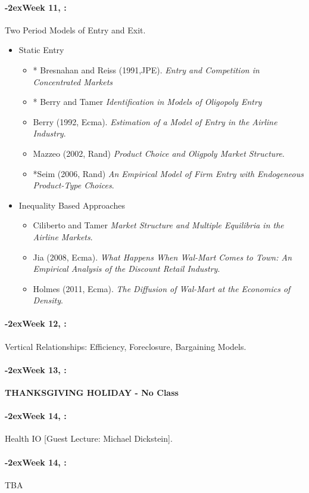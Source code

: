 \documentclass[11pt]{article}
\newcommand{\week}[1]{%
  \paragraph*{\kern-2ex\quad #1, \syldate{\today}:}%
  \ifdim\wd1=\wd\THURSDAY
    \AdvanceDate[7]
  \else
    \AdvanceDate[7]
  \fi%
}
\begin{document}
\week{Week 11} Two Period Models of Entry and Exit.
\begin{itemize}
\item Static Entry
\begin{itemize}
\item * Bresnahan and Reiss (1991,JPE). \textit{Entry and Competition in Concentrated Markets}
\item * Berry and Tamer \textit{Identification in Models of Oligopoly Entry}
\item Berry (1992, Ecma). \textit{Estimation of a Model of Entry in the Airline Industry}.
\item Mazzeo (2002, Rand) \textit{Product Choice and Oligpoly Market Structure}.
\item *Seim (2006, Rand) \textit{ An Empirical Model of Firm Entry with Endogeneous Product-Type Choices}.
\end{itemize}
\item Inequality Based Approaches
\begin{itemize}
\item Ciliberto and Tamer \textit{Market Structure and Multiple Equilibria in the Airline Markets}.
\item Jia (2008, Ecma). \textit{What Happens When Wal-Mart Comes to Town: An Empirical Analysis of the Discount Retail Industry}.
\item Holmes (2011, Ecma). \textit{The Diffusion of Wal-Mart at the Economics of Density}.
\end{itemize}
\end{itemize}

\week{Week 12} Vertical Relationships: Efficiency, Foreclosure, Bargaining Models.
\week{Week 13} \textbf{THANKSGIVING HOLIDAY - No Class}
\week{Week 14} Health IO [Guest Lecture: Michael Dickstein].
\week{Week 14} TBA
\end{document}
